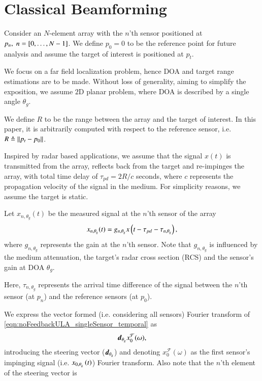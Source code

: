 \section{Classical Beamforming }\label{sec:setup}
Consider an $N$-element array with the $n$'th sensor positioned at $p_n,\; n=\left[{0,\ldots,N-1}\right]$. We define $p_{0}=0$ to be the reference point for future analysis and assume the target of interest is positioned at $p_t$.
\par We focus on a far field localization problem, hence DOA and target range estimations are to be made. Without loss of generality, aiming to simplify the exposition, we assume $2\text{D}$ planar problem, where DOA is described by a single angle $\theta_g$. 
\par We define $R$ to be the range between the array and the target of interest. In this paper, it is arbitrarily computed with respect to the reference sensor, i.e. $R\triangleq\left\Vert p_{t}-p_{0}\right\Vert$.
\par Inspired by radar based applications, we assume that the signal $x(t)$ is transmitted from the array, reflects back from the target and re-impinges the array, with total time delay of $\tau_{pd}=2R/c$ seconds, where $c$ represents the propagation velocity of the signal in the medium. For simplicity reasons, we assume the target is static.
\par Let $x_{n,\theta_g}(t)$ be the measured signal at the $n$'th sensor of the array
\begin{equation}
x_{n,\theta_g}(t) = g_{n,\theta_{g}}x\Brack{t-\tau_{pd}-\tau_{n,\theta_{g}}},
\label{eqn:noFeedbackULA_singleSensor_temporal}
\end{equation}
where $g_{n,\theta_{g}}$ represents the gain at the $n$'th sensor. Note that $g_{n,\theta_{g}}$ is influenced by the medium attenuation, the target's radar cross section (RCS) and the sensor's gain at DOA $\theta_g$. 
\par Here, $\tau_{n,\theta_{g}}$ represents the arrival time difference of the signal between the $n$'th sensor (at $p_n$) and the reference sensors (at $p_{0}$). 
\par We express the vector formed (i.e. considering all sensors) Fourier transform of \eqref{eqn:noFeedbackULA_singleSensor_temporal} as  
\[
\boldsymbol{d}_{\theta_g}x^\mathcal{F}_0(\omega),
\]
introducing the steering vector ($\boldsymbol{d}_{\theta_g}$) and denoting $x^\mathcal{F}_0(\omega)$ as the first sensor's impinging signal (i.e. $x_{0,\theta_g}\left({t}\right)$) Fourier transform. Also note that the $n$'th element of the steering vector is
